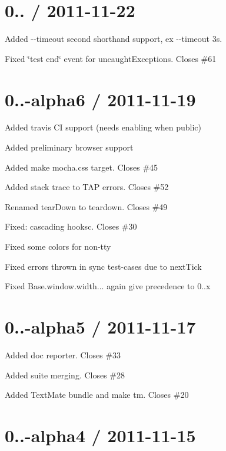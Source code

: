 \section*{0.. / 2011-\/11-\/22}


\begin{DoxyItemize}
\item Added {\ttfamily -\/-\/timeout} second shorthand support, ex {\ttfamily -\/-\/timeout 3s}.
\item Fixed \char`\"{}test end\char`\"{} event for uncaught\+Exceptions. Closes \#61
\end{DoxyItemize}

\section*{0..-\/alpha6 / 2011-\/11-\/19}


\begin{DoxyItemize}
\item Added travis CI support (needs enabling when public)
\item Added preliminary browser support
\item Added {\ttfamily make mocha.\+css} target. Closes \#45
\item Added stack trace to T\+AP errors. Closes \#52
\item Renamed tear\+Down to teardown. Closes \#49
\item Fixed\+: cascading hooksc. Closes \#30
\item Fixed some colors for non-\/tty
\item Fixed errors thrown in sync test-\/cases due to next\+Tick
\item Fixed Base.\+window.\+width... again give precedence to 0..\+x
\end{DoxyItemize}

\section*{0..-\/alpha5 / 2011-\/11-\/17}


\begin{DoxyItemize}
\item Added {\ttfamily doc} reporter. Closes \#33
\item Added suite merging. Closes \#28
\item Added Text\+Mate bundle and {\ttfamily make tm}. Closes \#20
\end{DoxyItemize}

\section*{0..-\/alpha4 / 2011-\/11-\/15}


